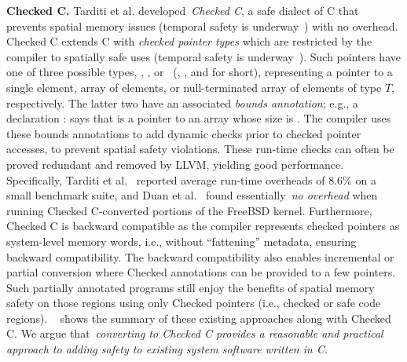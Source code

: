 {\noindent
\textbf{Checked C.} Tarditi et al. developed~\emph{Checked C}, a safe dialect of C that prevents spatial memory issues (temporal safety is underway~\cite{checkedc:temporal}) with no overhead.
Checked C extends C with \emph{checked pointer
  types} which are restricted by the compiler to spatially safe uses (temporal safety is underway~\cite{checkedc:temporal}).
Such pointers have one of three possible types, , ,
or~ (\ptr, \arr, and \ntarr{} for short), representing a
pointer to a single element, array of elements, or null-terminated
array of elements of type $T$, respectively. The latter two have an
associated \emph{bounds annotation}; e.g., a declaration 
 :  says that  is a pointer to an  array whose size is .
The compiler uses these bounds annotations to add dynamic checks prior to checked pointer accesses, to prevent spatial safety violations.
These run-time checks can often be proved redundant and removed by LLVM, yielding good performance.
Specifically, Tarditi et al.~\cite{tarditi2018checked} reported average
run-time overheads of 8.6\% on a small benchmark suite, and
Duan et al.~\cite{duanrefactoring} found essentially~\emph{no overhead} when running
Checked C-converted portions of the FreeBSD kernel.
Furthermore, Checked C is backward compatible as the compiler  represents checked pointers as system-level memory words, i.e., without
``fattening'' metadata, ensuring backward compatibility. 
The backward compatibility also enables incremental or partial conversion where Checked annotations can be provided to a few pointers.
Such partially annotated programs still enjoy the benefits of spatial memory safety on those regions using only Checked pointers (i.e., checked or safe code regions).
~ shows the summary of these existing approaches along with Checked C.
We argue that~\emph{converting to Checked C provides a reasonable and practical approach to adding safety to existing system software written in C}.
}


